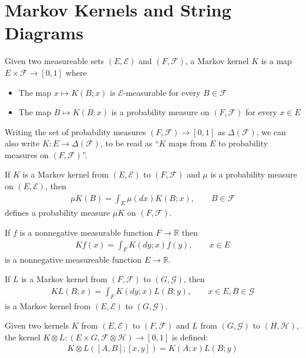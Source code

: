 
\section{Markov Kernels and String Diagrams}



\begin{definition}
Given two measureable sets $(E,\mathcal{E})$ and $(F,\mathcal{F})$, a Markov kernel $K$ is a map $E\times \mathcal{F} \to [0,1]$ where
\begin{itemize}
    \item The map $x\mapsto K(B;x)$ is $\mathcal{E}$-measurable for every $B\in\mathcal{F}$
    \item The map $B\mapsto K(B;x)$ is a probability measure on $(F,\mathcal{F})$ for every $x\in E$ 
\end{itemize}

Writing the set of probability measures $(F,\mathcal{F})\to [0,1]$ as $\Delta(\mathcal{F})$, we can also write $K:E\to \Delta(\mathcal{F})$, to be read as ``$K$ maps from $E$ to probability measures on $(F,\mathcal{F})$''.

\end{definition}

\begin{definition}\label{def:kernel_products}
If $K$ is a Markov kernel from $(E,\mathcal{E})$ to $(F,\mathcal{F})$ and $\mu$ is a probability measure on $(E,\mathcal{E})$, then
\begin{align}
    \mu K(B)=\int_E \mu(dx) K(B;x),\qquad B\in\mathcal{F}
\end{align}
defines a probability measure $\mu K$ on $(F,\mathcal{F})$.

If $f$ is a nonnegative measurable function $F\to \mathbb{R}$ then
\begin{align}
    Kf(x) = \int_F K(dy;x)f(y), \qquad x\in E
\end{align}
is a nonnegative measureable function $E\to \mathbb{R}$.

If $L$ is a Markov kernel from $(F,\mathcal{F})$ to $(G,\mathcal{G})$, then
\begin{align}
    KL(B;x) = \int_F K(dy;x) L(B;y),\qquad x\in E, B\in \mathcal{G}
\end{align}
is a Markov kernel from $(E,\mathcal{E})$ to $(G,\mathcal{G})$. \cite{cinlar_probability_2011}
\end{definition}

\begin{definition}
Given two kernels $K$ from $(E,\mathcal{E})$ to $(F,\mathcal{F})$ and $L$ from $(G,\mathcal{G})$ to $(H,\mathcal{H})$, the kernel $K\otimes L: (E\times G,\mathcal{F}\otimes \mathcal{H})\to [0,1]$ is defined:
\begin{align}
    K\otimes L([A,B];[x,y]) = K(A;x)L(B;y)
\end{align}
\end{definition}

